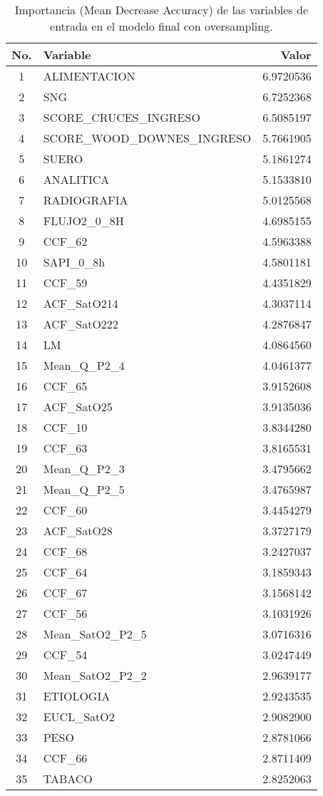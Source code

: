\begin{table}[H]
    \centering
    \begin{tabular}{|c|l|r|}
        \hline
        \textbf{No.} & \textbf{Variable} & \textbf{Valor} \\
        \hline
        1 & ALIMENTACION & 6.9720536 \\
        2 & SNG & 6.7252368 \\
        3 & SCORE\_CRUCES\_INGRESO & 6.5085197 \\
        4 & SCORE\_WOOD\_DOWNES\_INGRESO & 5.7661905 \\
        5 & SUERO & 5.1861274 \\
        6 & ANALITICA & 5.1533810 \\
        7 & RADIOGRAFIA & 5.0125568 \\
        8 & FLUJO2\_0\_8H & 4.6985155 \\
        9 & CCF\_62 & 4.5963388 \\
        10 & SAPI\_0\_8h & 4.5801181 \\
        11 & CCF\_59 & 4.4351829 \\
        12 & ACF\_SatO214 & 4.3037114 \\
        13 & ACF\_SatO222 & 4.2876847 \\
        14 & LM & 4.0864560 \\
        15 & Mean\_Q\_P2\_4 & 4.0461377 \\
        16 & CCF\_65 & 3.9152608 \\
        17 & ACF\_SatO25 & 3.9135036 \\
        18 & CCF\_10 & 3.8344280 \\
        19 & CCF\_63 & 3.8165531 \\
        20 & Mean\_Q\_P2\_3 & 3.4795662 \\
        21 & Mean\_Q\_P2\_5 & 3.4765987 \\
        22 & CCF\_60 & 3.4454279 \\
        23 & ACF\_SatO28 & 3.3727179 \\
        24 & CCF\_68 & 3.2427037 \\
        25 & CCF\_64 & 3.1859343 \\
        26 & CCF\_67 & 3.1568142 \\
        27 & CCF\_56 & 3.1031926 \\
        28 & Mean\_SatO2\_P2\_5 & 3.0716316 \\
        29 & CCF\_54 & 3.0247449 \\
        30 & Mean\_SatO2\_P2\_2 & 2.9639177 \\
        31 & ETIOLOGIA & 2.9243535 \\
        32 & EUCL\_SatO2 & 2.9082900 \\
        33 & PESO & 2.8781066 \\
        34 & CCF\_66 & 2.8711409 \\
        35 & TABACO & 2.8252063 \\
        \hline
    \end{tabular}
    \caption{Importancia (Mean Decrease Accuracy) de las variables de entrada en el modelo final con oversampling.}
    \label{tabla:importancia_variables_modelo_final}
\end{table}

